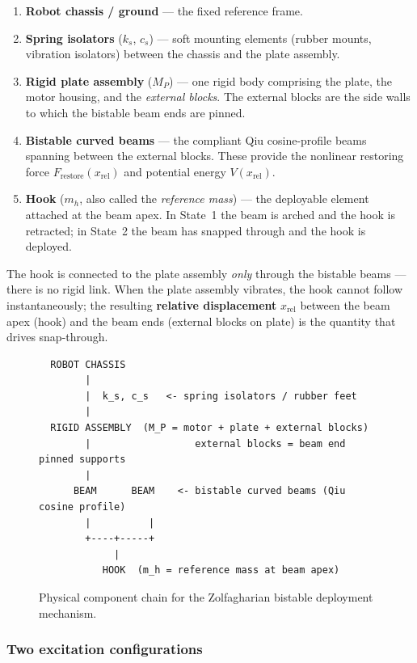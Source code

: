 \documentclass[11pt,letterpaper]{article}
\begin{document}
\begin{enumerate}[nosep]
  \item \textbf{Robot chassis / ground} --- the fixed reference frame.
  \item \textbf{Spring isolators} ($k_s$, $c_s$) --- soft mounting elements
    (rubber mounts, vibration isolators) between the chassis and the plate
    assembly.
  \item \textbf{Rigid plate assembly} ($M_P$) --- one rigid body comprising the
    plate, the motor housing, and the \emph{external blocks}.  The external
    blocks are the side walls to which the bistable beam ends are pinned.
  \item \textbf{Bistable curved beams} --- the compliant Qiu cosine-profile beams
    spanning between the external blocks.  These provide the nonlinear
    restoring force $F_{\mathrm{restore}}(x_{\mathrm{rel}})$ and potential
    energy $V(x_{\mathrm{rel}})$.
  \item \textbf{Hook} ($m_h$, also called the \emph{reference mass}) --- the
    deployable element attached at the beam apex.  In State~1 the beam is
    arched and the hook is retracted; in State~2 the beam has snapped through
    and the hook is deployed.
\end{enumerate}

\noindent The hook is connected to the plate assembly \emph{only} through the
bistable beams --- there is no rigid link.  When the plate assembly vibrates,
the hook cannot follow instantaneously; the resulting \textbf{relative
displacement} $x_{\mathrm{rel}}$ between the beam apex (hook) and the beam ends
(external blocks on plate) is the quantity that drives snap-through.

\begin{figure}[H]
\centering
\begin{verbatim}
  ROBOT CHASSIS
        |
        |  k_s, c_s   <- spring isolators / rubber feet
        |
  RIGID ASSEMBLY  (M_P = motor + plate + external blocks)
        |                  external blocks = beam end pinned supports
        |
      BEAM      BEAM    <- bistable curved beams (Qiu cosine profile)
        |          |
        +----+-----+
             |
           HOOK  (m_h = reference mass at beam apex)
\end{verbatim}
\caption{Physical component chain for the Zolfagharian bistable deployment
         mechanism.}
\label{fig:chain}
\end{figure}

\subsubsection{Two excitation configurations}
\end{document}
